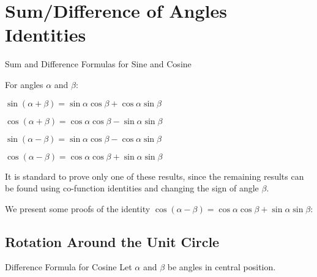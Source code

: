 \section{Sum/Difference of Angles Identities}

\begin{thm}{Sum and Difference Formulas for Sine and Cosine}
  \hspace{1cm}

For angles $\alpha$ and $\beta$:

\begin{multicols}{2}
  $\sin(\alpha + \beta) = \sin\alpha\cos\beta + \cos\alpha\sin\beta$

  $\cos(\alpha + \beta) = \cos\alpha\cos\beta - \sin\alpha\sin\beta$

  $\sin(\alpha - \beta) = \sin\alpha\cos\beta - \cos\alpha\sin\beta$

  $\cos(\alpha - \beta) = \cos\alpha\cos\beta + \sin\alpha\sin\beta$
\end{multicols}
\end{thm}

It is standard to prove only one of these results, since the remaining results can be found using co-function identities and changing the sign of angle $\beta$.

We present some proofs of the identity $\cos(\alpha - \beta) = \cos\alpha\cos\beta + \sin\alpha\sin\beta$:

\subsection{Rotation Around the Unit Circle}

\begin{prf}{Difference Formula for Cosine}
  Let $\alpha$ and $\beta$ be angles in central position.

\end{prf}
